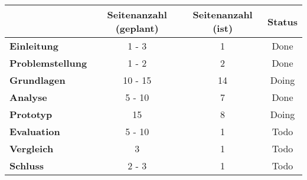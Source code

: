 \begin{table}[H]
\centering
\begin{tabular}{l|c|c|c}
                               & \textbf{Seitenanzahl (geplant)} & \textbf{Seitenanzahl (ist)} & \textbf{Status}        \\ \hline
\textbf{Einleitung}            & 1 - 3                           & {\color{yellow} 1}          & {\color{green} Done}   \\ \hline
\textbf{Problemstellung}       & 1 - 2                           & {\color{green} 2}           & {\color{green} Done}   \\ \hline
\textbf{Grundlagen}            & 10 - 15                         & {\color{green} 14}          & {\color{yellow} Doing} \\ \hline
\textbf{Analyse}               & 5 - 10                          & {\color{green} 7}           & {\color{green} Done}   \\ \hline
\textbf{Prototyp}              & 15                              & {\color{red} 8}             & {\color{yellow} Doing} \\ \hline
\textbf{Evaluation}            & 5 - 10                          & {\color{red} 1}             & {\color{red} Todo}     \\ \hline
\textbf{Vergleich}             & 3                               & {\color{red} 1}             & {\color{red} Todo}     \\ \hline
\textbf{Schluss}               & 2 - 3                           & {\color{red} 1}             & {\color{red} Todo}     \\
\end{tabular}
\end{table}